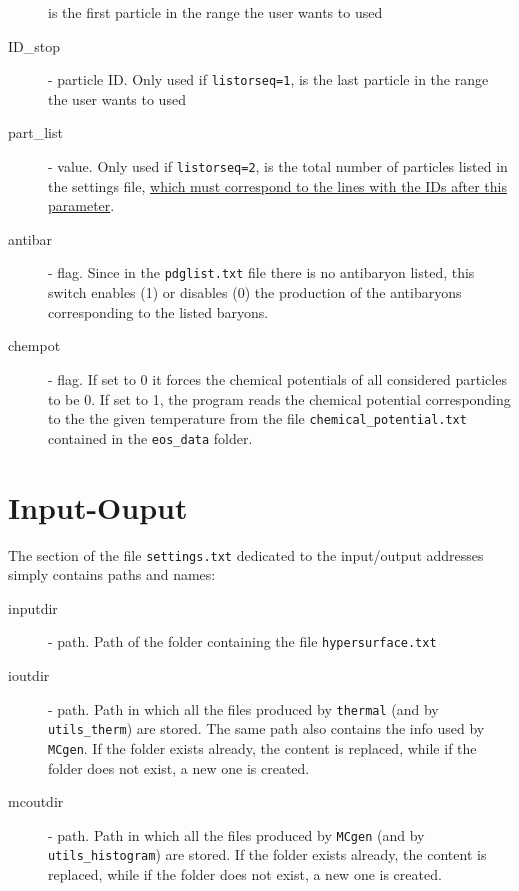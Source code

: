 \begin{description}
 is the first particle in the  range the user wants to used
 \item[ID\_stop] \integer - particle ID. Only used if {\tt listorseq=1}, 
 is the last particle in the  range the user wants to used
  \item[part\_list]  \integer - value.   Only used if {\tt listorseq=2}, is the total
  number of particles listed in the settings file, \ul{which must 
  correspond to the lines with the IDs after this parameter}.
  \item[antibar] \integer - flag. Since in the {\tt pdglist.txt} file there is no
  antibaryon listed, this switch enables (1) or disables (0) the production of the
  antibaryons corresponding to the listed baryons.
  \item[chempot] \integer - flag. If set to 0 it forces the chemical potentials 
  of all considered particles to be 0. If set to 1, the program reads the 
  chemical potential corresponding to the the given temperature from the file 
  {\tt chemical\_potential.txt} contained in the {\tt eos\_data} folder.
  \end{description}
  
  \section{Input-Ouput}
 The section of the file {\tt settings.txt} dedicated to the input/output 
 addresses simply contains  paths and  names:
  \begin{description}
  \item[inputdir]  - path.  Path of the folder containing the 
  file {\tt hypersurface.txt}
  \item[ioutdir]  - path. Path in which all the files produced by {\tt thermal} (and by {\tt utils\_therm}) are stored. The same path also contains the info used by {\tt MCgen}. 
  If the folder exists already, the content is replaced, while if the folder does not exist, a new one is created. 
  \item[mcoutdir]  - path.    Path in which all the files produced by {\tt MCgen}  (and by {\tt utils\_histogram})   are stored. 
  If the folder exists already, the content is replaced, while if the folder does not exist, a new one is created. 
\end{description}


